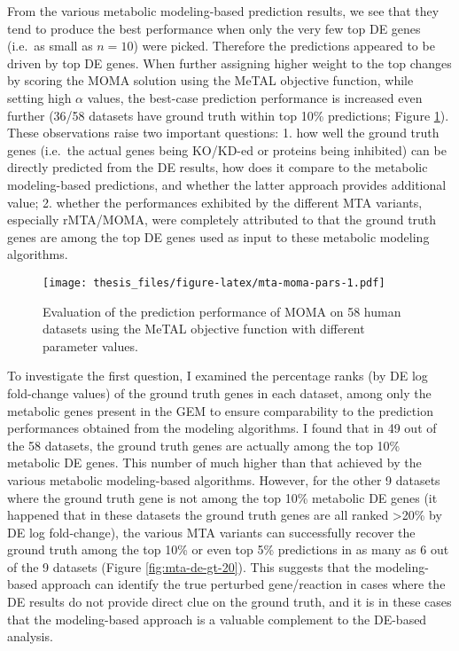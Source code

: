\documentclass[12pt,twoside,openany,\mydriver]{thesis}  %
\begin{document}
From the various metabolic modeling-based prediction results, we see that they tend to produce the best performance when only the very few top DE genes (i.e.~as small as \(n=10\)) were picked. Therefore the predictions appeared to be driven by top DE genes. When further assigning higher weight to the top changes by scoring the MOMA solution using the MeTAL objective function, while setting high \(\alpha\) values, the best-case prediction performance is increased even further (36/58 datasets have ground truth within top 10\% predictions; Figure \ref{fig:mta-moma-pars}). These observations raise two important questions: 1. how well the ground truth genes (i.e.~the actual genes being KO/KD-ed or proteins being inhibited) can be directly predicted from the DE results, how does it compare to the metabolic modeling-based predictions, and whether the latter approach provides additional value; 2. whether the performances exhibited by the different MTA variants, especially rMTA/MOMA, were completely attributed to that the ground truth genes are among the top DE genes used as input to these metabolic modeling algorithms.
\begin{figure}
\centering
\texttt{[image: thesis\_files/figure-latex/mta-moma-pars-1.pdf]}
\caption{\label{fig:mta-moma-pars}Evaluation of the prediction performance of MOMA on 58 human datasets using the MeTAL objective function with different parameter values.}
\end{figure}
To investigate the first question, I examined the percentage ranks (by DE log fold-change values) of the ground truth genes in each dataset, among only the metabolic genes present in the GEM to ensure comparability to the prediction performances obtained from the modeling algorithms. I found that in 49 out of the 58 datasets, the ground truth genes are actually among the top 10\% metabolic DE genes. This number of much higher than that achieved by the various metabolic modeling-based algorithms. However, for the other 9 datasets where the ground truth gene is not among the top 10\% metabolic DE genes (it happened that in these datasets the ground truth genes are all ranked \textgreater{}20\% by DE log fold-change), the various MTA variants can successfully recover the ground truth among the top 10\% or even top 5\% predictions in as many as 6 out of the 9 datasets (Figure \ref{fig:mta-de-gt-20}). This suggests that the modeling-based approach can identify the true perturbed gene/reaction in cases where the DE results do not provide direct clue on the ground truth, and it is in these cases that the modeling-based approach is a valuable complement to the DE-based analysis.
\end{document}
